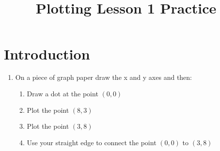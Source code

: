 \documentclass[11pt]{article}
\title{Plotting Lesson 1 Practice}
\begin{document}
\maketitle
\section*{Introduction}

\begin{enumerate}
	\item On a piece of graph paper  draw the x and y axes and then:
	\begin{enumerate}
		\item Draw a dot at the point $(0,0)$
		\item Plot the point $(8, 3)$
		\item Plot the point $(3,8)$
		\item Use your straight edge to connect the point $(0, 0)$ to $(3,8)$
	\end{enumerate} 
\end{enumerate}
\end{document}
